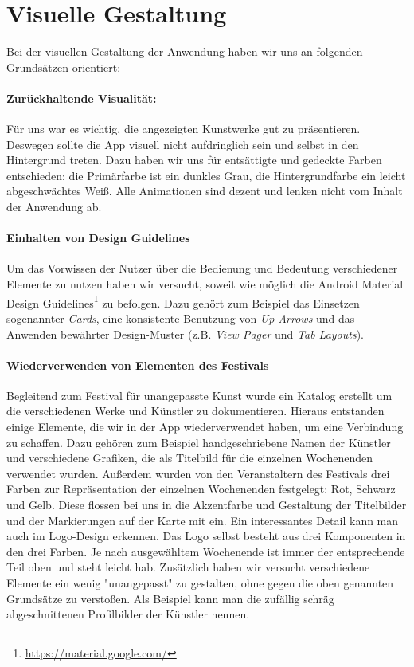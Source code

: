 \section{Visuelle Gestaltung}
Bei der visuellen Gestaltung der Anwendung haben wir uns an folgenden Grundsätzen orientiert:
\paragraph{Zurückhaltende Visualität:}Für uns war es wichtig, die angezeigten Kunstwerke gut zu präsentieren. Deswegen sollte die App visuell nicht aufdringlich sein und selbst in den Hintergrund treten. Dazu haben wir uns für entsättigte und gedeckte Farben entschieden: die Primärfarbe ist ein dunkles Grau, die Hintergrundfarbe ein leicht abgeschwächtes Weiß. Alle Animationen sind dezent und lenken nicht vom Inhalt der Anwendung ab.
\paragraph{Einhalten von Design Guidelines} Um das Vorwissen der Nutzer über die Bedienung und Bedeutung verschiedener Elemente zu nutzen haben wir versucht, soweit wie möglich die Android Material Design Guidelines\footnote{\url{https://material.google.com/}} zu befolgen. Dazu gehört zum Beispiel das Einsetzen sogenannter \textit{Cards}, eine konsistente Benutzung von \textit{Up-Arrows} und das Anwenden bewährter Design-Muster (z.B. \textit{View Pager} und \textit{Tab Layouts}).
\paragraph{Wiederverwenden von Elementen des Festivals} Begleitend zum Festival für unangepasste Kunst wurde ein Katalog erstellt um die verschiedenen Werke und Künstler zu dokumentieren. Hieraus entstanden einige Elemente, die wir in der App wiederverwendet haben, um eine Verbindung zu schaffen. Dazu gehören zum Beispiel handgeschriebene Namen der Künstler und verschiedene Grafiken, die als Titelbild für die einzelnen Wochenenden verwendet wurden. Außerdem wurden von den Veranstaltern des Festivals drei Farben zur Repräsentation der einzelnen Wochenenden festgelegt: Rot, Schwarz und Gelb. Diese flossen bei uns in die Akzentfarbe und Gestaltung der Titelbilder und der Markierungen auf der Karte mit ein. Ein interessantes Detail kann man auch im Logo-Design erkennen. Das Logo selbst besteht aus drei Komponenten in den drei Farben. Je nach ausgewähltem Wochenende ist immer der entsprechende Teil oben und steht leicht hab.
Zusätzlich haben wir versucht verschiedene Elemente ein wenig "unangepasst" zu gestalten, ohne gegen die oben genannten Grundsätze zu verstoßen. Als Beispiel kann man die zufällig schräg abgeschnittenen Profilbilder der Künstler nennen.